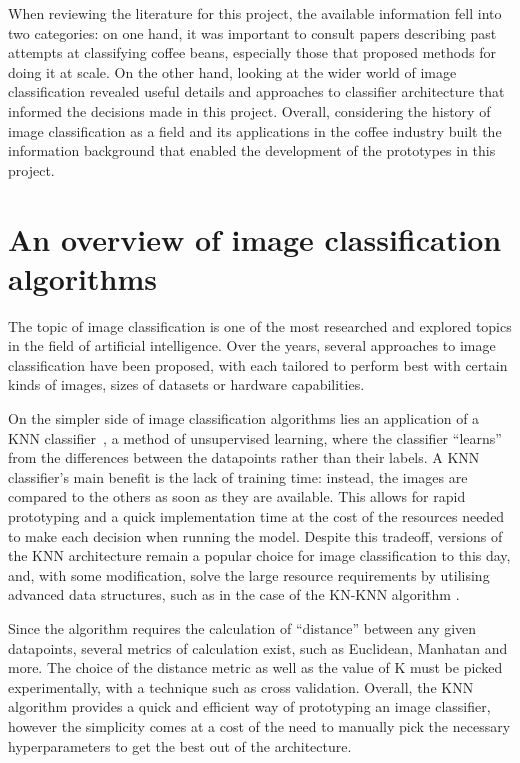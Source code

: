 When reviewing the literature for this project, the available information fell into two categories:
on one hand, it was important to consult papers describing past attempts at classifying coffee beans,
especially those that proposed methods for doing it at scale.
On the other hand, looking at the wider world of image classification revealed useful details and approaches to
classifier architecture that informed the decisions made in this project.
Overall, considering the history of image classification as a field and its applications in the coffee industry
built the information background that enabled the development of the prototypes in this project.

\section{An overview of image classification algorithms}
\label{sec:lit-review-general}
The topic of image classification is one of the most researched and explored topics in the field of artificial intelligence.
Over the years, several approaches to image classification have been proposed, with each tailored to perform best with
certain kinds of images, sizes of datasets or hardware capabilities.

On the simpler side of image classification algorithms lies an application of a KNN classifier~\cite{knnOverview}, a method of
unsupervised learning, where the classifier ``learns'' from the differences between the datapoints rather than their labels.
A KNN classifier's main benefit is the lack of training time: instead, the images are compared to the others as soon as
they are available.
This allows for rapid prototyping and a quick implementation time at the cost of the resources needed to make each decision
when running the model.
Despite this tradeoff, versions of the KNN architecture remain a popular choice for image classification to this day,
and, with some modification, solve the large resource requirements by utilising advanced data structures, such as in the
case of the KN-KNN algorithm \cite{kdtreeKNN}.

Since the algorithm requires the calculation of ``distance'' between any given datapoints, several metrics of calculation
exist, such as Euclidean, Manhatan and more.
The choice of the distance metric as well as the value of K must be picked experimentally, with a technique such as
cross validation.
Overall, the KNN algorithm provides a quick and efficient way of prototyping an image classifier, however the simplicity
comes at a cost of the need to manually pick the necessary hyperparameters to get the best out of the architecture.


